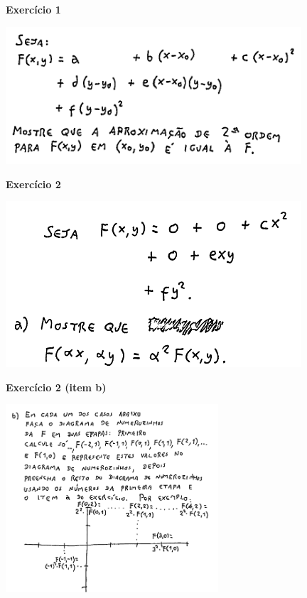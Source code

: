 \documentclass[oneside,12pt]{article}
\begin{document}
{\bf Exercício 1}

\includegraphics[width=11cm]{2020-1-C3/20201125_115134_exerc_1.pdf}

\newpage


{\bf Exercício 2}

\includegraphics[width=11cm]{2020-1-C3/20201125_115243_exerc_2a.pdf}

\newpage


{\bf Exercício 2 (item b)}

\includegraphics[height=7cm]{2020-1-C3/20201125_115407_exerc_2b.pdf}
\end{document}
